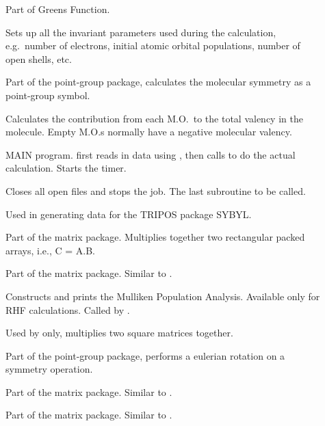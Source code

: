 \begin{description}
\item[] Part of Greens Function.

\item[] Sets up all the invariant parameters used during
the calculation, e.g.\ number of electrons, initial atomic  orbital
populations, number of open shells, etc. 

\item[] Part of the point-group package,  calculates
the molecular symmetry as a point-group symbol.

\item[] Calculates the contribution from each M.O.\ to the total
valency in the molecule.  Empty M.O.s normally have a negative molecular
valency.

\item[] MAIN program.  first reads in data using 
, then calls  to do the actual calculation. Starts
the timer.

\item[] Closes all open files and stops the job.  The last
subroutine to be called.

\item[] Used in generating data for the TRIPOS
package SYBYL.

\item[] Part of the matrix package. Multiplies together two
rectangular packed arrays, i.e., C = A.B.

\item[] Part of the matrix package.  Similar to .

\item[] Constructs and prints the Mulliken
Population  Analysis. Available only for RHF calculations. Called by
.

\item[] Used by  only,  multiplies two
square  matrices together. 

\item[] Part of the point-group package,   performs
 a  eulerian rotation on a symmetry operation.

\item[] Part of the matrix package. Similar to .

\item[] Part of the matrix package. Similar to .


\end{description}
